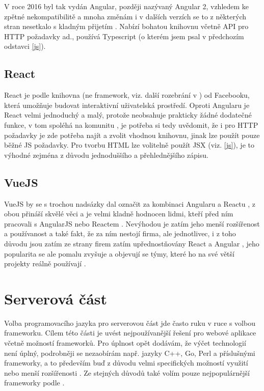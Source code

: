         V roce 2016 byl tak vydán Angular, později nazývaný Angular 2, vzhledem ke zpětné nekompatibilitě a mnoha změnám i v dalších verzích \cite{js-fw2} se to z některých stran nesetkalo s kladným přijetím \cite{angular2}\cite{js-fw1}. Nabízí bohatou knihovnu včetně API pro HTTP požadavky ad., používá Typescript (o kterém jsem psal v předchozím odstavci \ref{js}).
        
        \subsection{React}\label{react}
        React je podle \cite{react} knihovna (ne framework, viz. další rozebrání v \cite{js-fw1}) od Facebooku, která umožňuje budovat interaktivní uživatelská prostředí. Oproti Angularu je React velmi jednoduchý a malý, protože neobsahuje prakticky žádné dodatečné funkce, v tom spoléhá na komunitu \cite{js-fw1}, je potřeba si tedy uvědomit, že i pro HTTP požadavky je zde potřeba najít a zvolit vhodnou knihovnu, jinak lze použít pouze běžné JS požadavky. Pro tvorbu HTML lze volitelně použít JSX (viz. \ref{js}), je to výhodné zejména z důvodu jednoduššího a přehlednějšího zápisu.
        
        \subsection{VueJS}
        VueJS by se s trochou nadsázky dal označit za kombinaci Angularu a Reactu \cite{js-fw5}, z obou přináší skvělé věci a je velmi kladně hodnocen lidmi, kteří před ním pracovali s AngularJS nebo Reactem \cite{js-fw1}. Nevýhodou je zatím jeho menší rozšířenost a používanost \cite{js-fw1} a také fakt, že za ním nestojí firma, ale jednotlivec, i z toho důvodu jsou zatím ze strany firem zatím upřednostňovány React a Angular \cite{js-fw4}, jeho popularita se ale pomalu zvyšuje a objevují se týmy, které ho na své větší projekty reálně používají \cite{js-fw1}.
    
    
    \section{Serverová část}
    Volba programovacího jazyka pro serverovou část jde často ruku v ruce s volbou frameworku. Cílem této části je uvést nejpoužívanější řešení pro webové aplikace včetně možností frameworků. Pro úplnost opět dodávám, že výčet technologií není úplný, podrobněji se nezaobírám např. jazyky C++, Go, Perl a příslušnými frameworky, a to především buď z důvodu velmi specifických možností využití \cite{technologie-c++} nebo menší rozšířenosti \cite{stack-stats18}\cite{jetbrains-stats}. Ze stejných důvodů také volím pouze nejpopulárnější frameworky podle \cite{hot-frameworks}.
    
